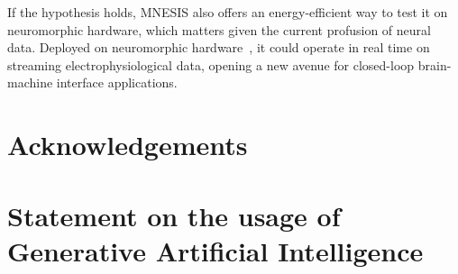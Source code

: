 \documentclass{scrartcl}
\newcommand{\citep}[1]{\parencite{#1}}
\begin{document}
If the hypothesis holds, MNESIS also offers an energy-efficient way to test it on neuromorphic hardware, which matters given the current profusion of neural data. Deployed on neuromorphic hardware~\citep{Goltz2021,Eshraghian2023}, it could operate in real time on streaming electrophysiological data, opening a new avenue for closed-loop brain-machine interface applications.
%
\section*{Acknowledgements}
\noindent \Acknowledgements
\section*{Statement on the usage of Generative Artificial Intelligence}
\noindent \AIstatement
\printbibliography
\end{document}
